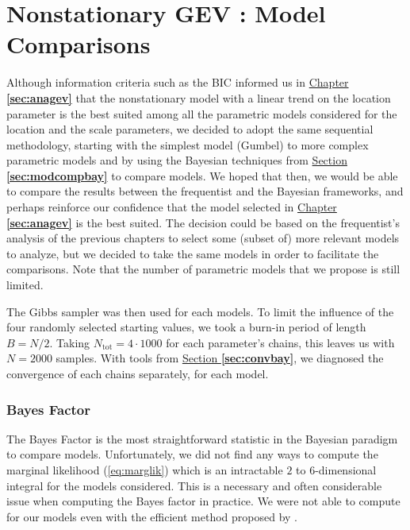 \section{Nonstationary GEV : Model Comparisons}\label{sec:baycomp}

Although information criteria such as the BIC informed us in \hyperref[sec:anagev]{Chapter \textbf{\ref{sec:anagev}}} that the nonstationary model with a linear trend on the location parameter is the best suited among all the parametric models considered for the location and the scale parameters, we decided to adopt the same sequential methodology, starting with the simplest model (Gumbel) to more complex parametric models and by using the Bayesian techniques from \hyperref[sec:modcompbay]{Section \textbf{\ref{sec:modcompbay}}} to compare models. We hoped that then, we would be able to compare the results between the frequentist and the Bayesian frameworks, and perhaps reinforce our confidence that the model selected in \hyperref[sec:anagev]{Chapter \textbf{\ref{sec:anagev}}} is the best suited.
The decision could be based on the frequentist's analysis of the previous chapters to select some (subset of) more relevant models to analyze, but we decided to take the same models in order to facilitate the comparisons. Note that the number of parametric models that we propose is still limited.


The Gibbs sampler was then used for each models. To limit the influence of the four randomly selected starting values, we took a burn-in period of length $B=N/2$. Taking $N_\text{tot}=4\cdot 1000$ for each parameter's chains, this leaves us with $N=2000$ samples.
With tools from \hyperref[sec:convbay]{Section \textbf{\ref{sec:convbay}}}, we diagnosed the convergence of each chains separately, for each model.

\subsubsection*{Bayes Factor}

The Bayes Factor is the most straightforward statistic in the Bayesian paradigm to compare models.
Unfortunately, we did not find any ways to compute the marginal likelihood (\ref{eq:marglik}) which is an intractable $2$ to $6$-dimensional integral for the models considered. This is a necessary and often considerable issue when computing the Bayes factor in practice. 
We were not able to compute for our models even with the efficient method proposed by \citet{chib_1995}.

